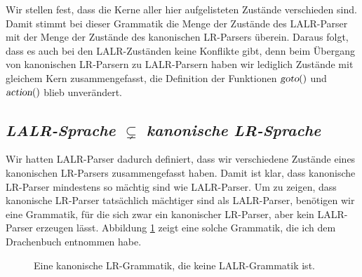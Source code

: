 Wir stellen fest, dass die Kerne aller hier aufgelisteten Zust\"ande verschieden sind.
Damit stimmt bei dieser Grammatik die Menge der Zust\"ande des LALR-Parser mit der Menge der
Zust\"ande des kanonischen LR-Parsers \"uberein.  Daraus folgt, dass es auch bei
den LALR-Zust\"anden keine Konflikte gibt, denn beim \"Ubergang von kanonischen LR-Parsern zu
LALR-Parsern haben wir lediglich Zust\"ande mit gleichem Kern zusammengefasst, die
Definition der Funktionen $\textsl{goto}()$ und $\textsl{action}()$ blieb unver\"andert.

\subsection{\emph{LALR-Sprache} $\subsetneq$ \emph{kanonische LR-Sprache}}
Wir hatten LALR-Parser dadurch definiert, dass wir verschiedene Zust\"ande eines kanonischen LR-Parsers
zusammengefasst haben.  Damit ist klar, dass kanonische LR-Parser mindestens so m\"achtig
sind wie LALR-Parser.  Um zu zeigen, dass kanonische LR-Parser tats\"achlich m\"achtiger sind
als LALR-Parser, ben\"otigen wir eine Grammatik, f\"ur die sich zwar ein kanonischer LR-Parser,
aber kein LALR-Parser erzeugen l\"asst.  Abbildung \ref{fig:lr-but-notlalr.g} zeigt eine
solche Grammatik, die ich dem Drachenbuch entnommen habe.

\begin{figure}[htbp]
  \begin{center}    
  \vspace*{-0.3cm}

  \end{center}
  \caption{Eine kanonische LR-Grammatik, die keine LALR-Grammatik ist.}
  \label{fig:lr-but-notlalr.g}
\end{figure}

